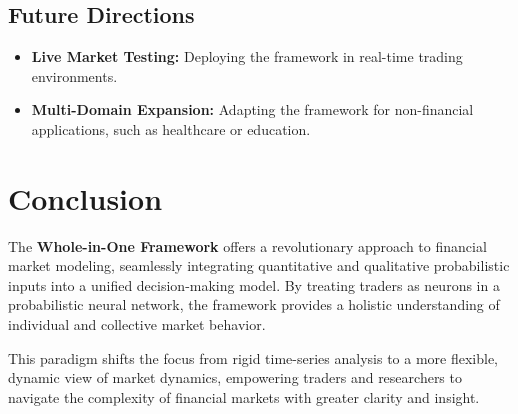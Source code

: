 \documentclass[a4]{article}
\newcommand{\bn}{\bigskip\noindent}
\begin{document}
\subsection{Future Directions}

\begin{itemize}
\item  {\bf Live Market Testing:}  Deploying the framework in real-time trading environments.
\item {\bf Multi-Domain Expansion:}  Adapting the framework for non-financial applications, such as healthcare or education.
\end{itemize}


\section{Conclusion}

The {\bf Whole-in-One Framework}  offers a revolutionary approach to financial market modeling, seamlessly integrating quantitative and qualitative probabilistic inputs into a unified decision-making model. By treating traders as neurons in a probabilistic neural network, the framework provides a holistic understanding of individual and collective market behavior.

\bn
This paradigm shifts the focus from rigid time-series analysis to a more flexible, dynamic view of market dynamics, empowering traders and researchers to navigate the complexity of financial markets with greater clarity and insight.
\end{document}
